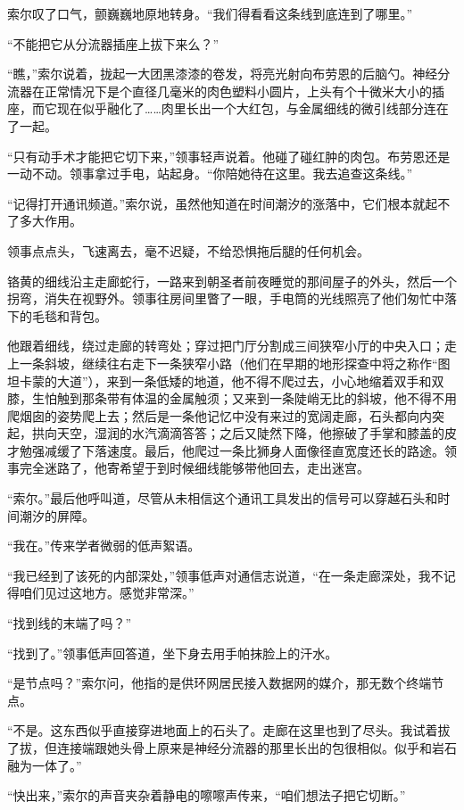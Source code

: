 \documentclass[AutoFakeBold=true]{book}
\begin{document}
索尔叹了口气，颤巍巍地原地转身。``我们得看看这条线到底连到了哪里。''

``不能把它从分流器插座上拔下来么？''

``瞧，''索尔说着，拢起一大团黑漆漆的卷发，将亮光射向布劳恩的后脑勺。神经分流器在正常情况下是个直径几毫米的肉色塑料小圆片，上头有个十微米大小的插座，而它现在似乎融化了……肉里长出一个大红包，与金属细线的微引线部分连在了一起。

``只有动手术才能把它切下来，''领事轻声说着。他碰了碰红肿的肉包。布劳恩还是一动不动。领事拿过手电，站起身。``你陪她待在这里。我去追查这条线。''

``记得打开通讯频道。''索尔说，虽然他知道在时间潮汐的涨落中，它们根本就起不了多大作用。

领事点点头，飞速离去，毫不迟疑，不给恐惧拖后腿的任何机会。

铬黄的细线沿主走廊蛇行，一路来到朝圣者前夜睡觉的那间屋子的外头，然后一个拐弯，消失在视野外。领事往房间里瞥了一眼，手电筒的光线照亮了他们匆忙中落下的毛毯和背包。

他跟着细线，绕过走廊的转弯处；穿过把门厅分割成三间狭窄小厅的中央入口；走上一条斜坡，继续往右走下一条狭窄小路（他们在早期的地形探查中将之称作``图坦卡蒙的大道''），来到一条低矮的地道，他不得不爬过去，小心地缩着双手和双膝，生怕触到那条带有体温的金属触须；又来到一条陡峭无比的斜坡，他不得不用爬烟囱的姿势爬上去；然后是一条他记忆中没有来过的宽阔走廊，石头都向内突起，拱向天空，湿润的水汽滴滴答答；之后又陡然下降，他擦破了手掌和膝盖的皮才勉强减缓了下落速度。最后，他爬过一条比狮身人面像径直宽度还长的路途。领事完全迷路了，他寄希望于到时候细线能够带他回去，走出迷宫。

``索尔。''最后他呼叫道，尽管从未相信这个通讯工具发出的信号可以穿越石头和时间潮汐的屏障。

``我在。''传来学者微弱的低声絮语。

``我已经到了该死的内部深处，''领事低声对通信志说道，``在一条走廊深处，我不记得咱们见过这地方。感觉非常深。''

``找到线的末端了吗？''

``找到了。''领事低声回答道，坐下身去用手帕抹脸上的汗水。

``是节点吗？''索尔问，他指的是供环网居民接入数据网的媒介，那无数个终端节点。

``不是。这东西似乎直接穿进地面上的石头了。走廊在这里也到了尽头。我试着拔了拔，但连接端跟她头骨上原来是神经分流器的那里长出的包很相似。似乎和岩石融为一体了。''

``快出来，''索尔的声音夹杂着静电的嚓嚓声传来，``咱们想法子把它切断。''
\end{document}
